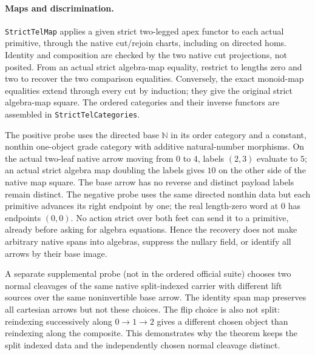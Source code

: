 \documentclass[11pt]{article}
\begin{document}
\paragraph{Maps and discrimination.}
\verb|StrictTelMap| applies a given strict two-legged apex functor to each actual primitive, through the native cut/rejoin charts, including on directed homs. Identity and composition are checked by the two native cut projections, not posited. From an actual strict algebra-map equality, restrict to lengths zero and two to recover the two comparison equalities. Conversely, the exact monoid-map equalities extend through every cut by induction; they give the original strict algebra-map square. The ordered categories and their inverse functors are assembled in \verb|StrictTelCategories|.

The positive probe uses the directed base \(\mathbb N\) in its order category and a constant, nonthin one-object grade category with additive natural-number morphisms. On the actual two-leaf native arrow moving from \(0\) to \(4\), labels \((2,3)\) evaluate to \(5\); an actual strict algebra map doubling the labels gives \(10\) on the other side of the native map square. The base arrow has no reverse and distinct payload labels remain distinct. The negative probe uses the same directed nonthin data but each primitive advances its right endpoint by one; the real length-zero word at \(0\) has endpoints \((0,0)\). No action strict over both feet can send it to a primitive, already before asking for algebra equations. Hence the recovery does not make arbitrary native spans into algebras, suppress the nullary field, or identify all arrows by their base image.

A separate supplemental probe (not in the ordered official suite) chooses two normal cleavages of the same native split-indexed carrier with different lift sources over the same noninvertible base arrow. The identity span map preserves all cartesian arrows but not these choices. The flip choice is also not split: reindexing successively along \(0\to1\to2\) gives a different chosen object than reindexing along the composite. This demonstrates why the theorem keeps the split indexed data and the independently chosen normal cleavage distinct.
\end{document}
